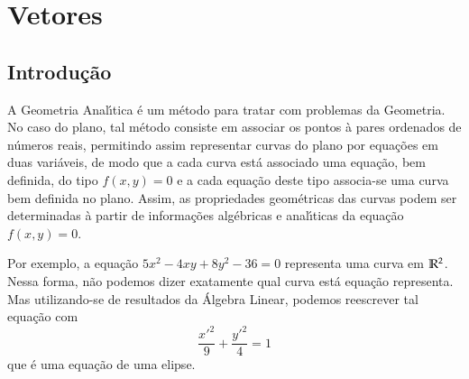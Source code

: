 
\chapter{Vetores} %
\label{cha:vetores}

\section{Introdu\c{c}\~ao} %
\label{sec:introducao}

A Geometria Anal{\'\i}tica \'e um m\'etodo para tratar com problemas da Geometria. No caso do plano, tal m\'etodo consiste em
associar os pontos \`a pares ordenados de n\'umeros reais, permitindo assim representar curvas do plano por equa\c{c}\~oes em duas
vari\'aveis, de modo que a cada curva est\'a associado uma equa\c{c}\~ao, bem definida, do tipo $f(x,y) = 0$ e a cada equa\c{c}\~ao
deste tipo associa-se uma curva bem definida no plano. Assim, as propriedades geom\'etricas das curvas podem ser
determinadas \`a partir de informa\c{c}\~oes alg\'ebricas e anal{\'\i}ticas da equa\c{c}\~ao $f(x, y) = 0$.

Por exemplo, a equa\c{c}\~ao $5x^2 - 4xy + 8y^2 - 36 = 0$ representa uma curva em $\mathbb{R}^2$. Nessa forma, n\~ao podemos dizer
exatamente qual curva est\'a equa\c{c}\~ao representa. Mas utilizando-se de resultados da \'Algebra Linear, podemos reescrever tal
equa\c{c}\~ao com
\[
  \dfrac{x'^2}{9} + \dfrac{y'^2}{4} = 1
\]
que \'e uma equa\c{c}\~ao de uma elipse.



